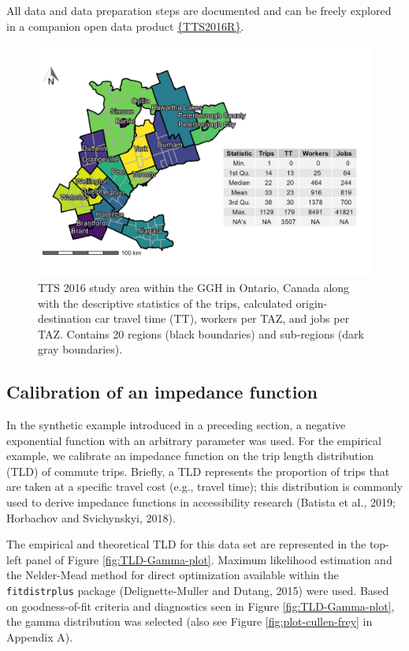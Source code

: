 \documentclass[]{elsarticle} %
\begin{document}
All data and data preparation steps are documented and can be freely
explored in a companion open data product
\href{https://github.com/soukhova/TTS2016R}{\{TTS2016R\}}.

\begin{figure}

{\centering \includegraphics[width=0.8\linewidth]{images/TTS16-survey-area} 

}

\caption{\label{fig:TTS-16-survey-area}TTS 2016 study area within the GGH in Ontario, Canada along with the descriptive statistics of the trips, calculated origin-destination car travel time (TT), workers per TAZ, and jobs per TAZ. Contains 20 regions (black boundaries) and sub-regions (dark gray boundaries).}\label{fig:TTS-16-survey-area}
\end{figure}

\hypertarget{calibration-of-an-impedance-function}{%
\subsection{Calibration of an impedance
function}\label{calibration-of-an-impedance-function}}

In the synthetic example introduced in a preceding section, a negative
exponential function with an arbitrary parameter was used. For the
empirical example, we calibrate an impedance function on the trip length
distribution (TLD) of commute trips. Briefly, a TLD represents the
proportion of trips that are taken at a specific travel cost (e.g.,
travel time); this distribution is commonly used to derive impedance
functions in accessibility research (Batista et al., 2019; Horbachov and
Svichynskyi, 2018).

The empirical and theoretical TLD for this data set are represented in
the top-left panel of Figure \ref{fig:TLD-Gamma-plot}. Maximum
likelihood estimation and the Nelder-Mead method for direct optimization
available within the \texttt{fitdistrplus} package (Delignette-Muller
and Dutang, 2015) were used. Based on goodness-of-fit criteria and
diagnostics seen in Figure \ref{fig:TLD-Gamma-plot}, the gamma
distribution was selected (also see Figure \ref{fig:plot-cullen-frey} in
Appendix A).
\end{document}
